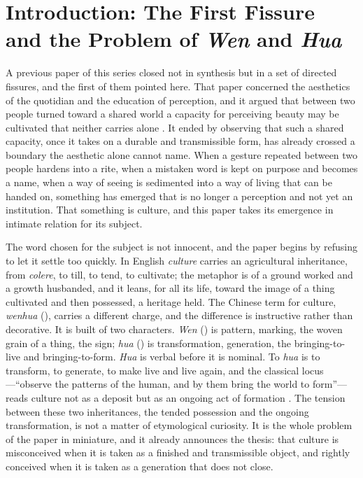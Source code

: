 \section{Introduction: The First Fissure and the Problem of \emph{Wen} and \emph{Hua}}
\label{p24:sec:intro}

\noindent
A previous paper of this series closed not in synthesis but in a set of directed fissures, and the first of them pointed here. That paper concerned the aesthetics of the quotidian and the education of perception, and it argued that between two people turned toward a shared world a capacity for perceiving beauty may be cultivated that neither carries alone \parencite{paperxxiii}. It ended by observing that such a shared capacity, once it takes on a durable and transmissible form, has already crossed a boundary the aesthetic alone cannot name. When a gesture repeated between two people hardens into a rite, when a mistaken word is kept on purpose and becomes a name, when a way of seeing is sedimented into a way of living that can be handed on, something has emerged that is no longer a perception and not yet an institution. That something is culture, and this paper takes its emergence in intimate relation for its subject.

The word chosen for the subject is not innocent, and the paper begins by refusing to let it settle too quickly. In English \emph{culture} carries an agricultural inheritance, from \emph{colere}, to till, to tend, to cultivate; the metaphor is of a ground worked and a growth husbanded, and it leans, for all its life, toward the image of a thing cultivated and then possessed, a heritage held. The Chinese term for culture, \emph{wenhua} (), carries a different charge, and the difference is instructive rather than decorative. It is built of two characters. \emph{Wen} () is pattern, marking, the woven grain of a thing, the sign; \emph{hua} () is transformation, generation, the bringing-to-live and bringing-to-form. \emph{Hua} is verbal before it is nominal. To \emph{hua} is to transform, to generate, to make live and live again, and the classical locus---``observe the patterns of the human, and by them bring the world to form''---reads culture not as a deposit but as an ongoing act of formation \parencite{legge1963yijing}. The tension between these two inheritances, the tended possession and the ongoing transformation, is not a matter of etymological curiosity. It is the whole problem of the paper in miniature, and it already announces the thesis: that culture is misconceived when it is taken as a finished and transmissible object, and rightly conceived when it is taken as a generation that does not close.

